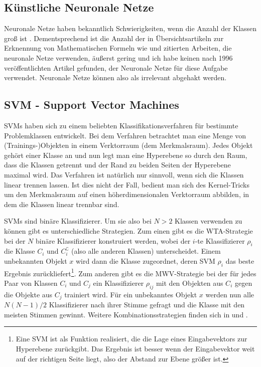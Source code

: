 \subsection{Künstliche Neuronale Netze} \label{sub:kuenstliche_neuronale_netze}

Neuronale Netze haben bekanntlich Schwierigkeiten, wenn die Anzahl der Klassen groß ist \cite{Jaeger:2003p1097}. Dementsprechend ist die Anzahl der in Übersichtsartikeln zur Erknennung von Mathematischen Formeln wie \cite{Chan:2000p559} und \cite{Tapia:2007p9160} zitierten Arbeiten, die neuronale Netze verwenden, äußerst gering und ich habe keinen nach 1996 veröffentlichten Artikel gefunden, der Neuronale Netze für diese Aufgabe verwendet. Neuronale Netze können also als irrelevant abgehakt werden.

\subsection[SVM]{SVM - Support Vector Machines} \label{sub:svm}

\ac{SVM}s \cite{kernels} haben sich zu einem beliebten Klassifikationsverfahren für bestimmte Problemklassen entwickelt. Bei dem Verfahren betrachtet man eine Menge von (Trainings-)Objekten in einem Verktorraum (dem Merkmalsraum). Jedes Objekt gehört einer Klasse an und nun legt man eine Hyperebene so durch den Raum, dass die Klassen getrennt und der Rand zu beiden Seiten der Hyperebene maximal wird. Das Verfahren ist natürlich nur sinnvoll, wenn sich die Klassen linear trennen lassen. Ist dies nicht der Fall, bedient man sich des Kernel-Tricks \cite[S.15]{kernels} um den Merkmalsraum auf einen höherdimensionalen Verktorraum abbilden, in dem die Klassen linear trennbar sind.

\ac{SVM}s sind binäre Klassifizierer. Um sie also bei $N>2$ Klassen verwenden zu können gibt es unterschiedliche Strategien. Zum einen gibt es die \ac{WTA}-Strategie bei der $N$ binäre Klassifizierer konstruiert werden, wobei der $i$-te Klassifizierer $\rho_i$ die Klasse $C_i$ und $C_i^{\complement}$ (also alle anderen Klassen) unterscheidet. Einem unbekannten Objekt $x$ wird dann die Klasse zugeordnet, deren SVM $\rho_i$ das beste Ergebnis zurückliefert\footnote{Eine SVM ist als Funktion realisiert, die die Lage eines Eingabevektors zur Hyperebene zurückgibt. Das Ergebnis ist besser wenn der Eingabevektor weit auf der richtigen Seite liegt, also der Abstand zur Ebene größer ist.}. Zum anderen gibt es die \ac{MWV}-Strategie bei der für jedes Paar von Klassen $C_i$ und $C_j$ ein Klassifizierer $\rho_{ij}$ mit den Objekten aus $C_i$ gegen die Objekte aus $C_j$ trainiert wird. Für ein unbekanntes Objekt $x$ werden nun alle $N(N-1)/2$ Klassifizierer nach ihrer Stimme gefragt und die Klasse mit den meisten Stimmen gewinnt. Weitere Kombinationsstrategien finden sich in \cite{Duan:2005p11426} und \cite{Platt:2000p11488}.

